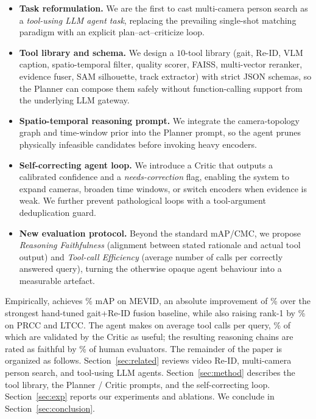 \begin{itemize}\setlength\itemsep{2pt}
  \item \textbf{Task reformulation.} We are the first to cast multi-camera
        person search as a \emph{tool-using LLM agent task}, replacing the
        prevailing single-shot matching paradigm with an explicit
        plan--act--criticize loop.
  \item \textbf{Tool library and schema.} We design a $10$-tool library
        (gait, Re-ID, VLM caption, spatio-temporal filter, quality scorer,
        FAISS, multi-vector reranker, evidence fuser, SAM silhouette,
        track extractor) with strict JSON schemas, so the Planner can
        compose them safely without function-calling support from the
        underlying LLM gateway.
  \item \textbf{Spatio-temporal reasoning prompt.} We integrate the
        camera-topology graph and time-window prior into the Planner
        prompt, so the agent prunes physically infeasible candidates
        before invoking heavy encoders.
  \item \textbf{Self-correcting agent loop.} We introduce a Critic that
        outputs a calibrated confidence and a \emph{needs-correction}
        flag, enabling the system to expand cameras, broaden time
        windows, or switch encoders when evidence is weak. We further
        prevent pathological loops with a tool-argument deduplication
        guard.
  \item \textbf{New evaluation protocol.} Beyond the standard mAP/CMC, we
        propose \emph{Reasoning Faithfulness} (alignment between stated
        rationale and actual tool output) and \emph{Tool-call Efficiency}
        (average number of calls per correctly answered query), turning
        the otherwise opaque agent behaviour into a measurable artefact.
\end{itemize}

Empirically, \method{} achieves \% mAP on MEVID, an absolute
improvement of \todo{$+\Delta$}\% over the strongest hand-tuned
gait+Re-ID fusion baseline, while also raising rank-1 by \% on
PRCC and LTCC. The agent makes on average  tool calls per query,
\% of which are validated by the Critic as useful; the resulting
reasoning chains are rated as faithful by \% of human evaluators.
The remainder of the paper is organized as follows.
Section~\ref{sec:related} reviews video Re-ID, multi-camera person search,
and tool-using LLM agents. Section~\ref{sec:method} describes the tool
library, the Planner / Critic prompts, and the self-correcting loop.
Section~\ref{sec:exp} reports our experiments and ablations. We conclude
in Section~\ref{sec:conclusion}.
